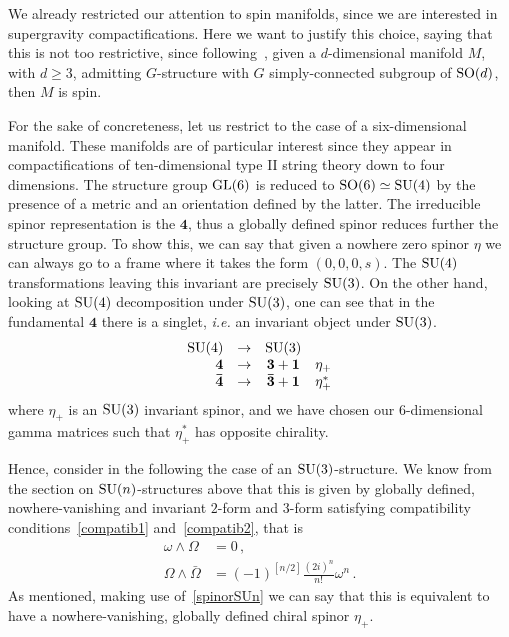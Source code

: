 \documentclass[debug]{phd}
\begin{document}
				We already restricted our attention to spin manifolds, since we are interested in supergravity compactifications.
				Here we want to justify this choice, saying that this is not too restrictive, since following~\cite[prop. 3.6.2]{joyce}, given a $d$-dimensional manifold $M$, with $d \geq 3$, admitting  $G$-structure with $G$ simply-connected subgroup of $\mathrm{SO}(d)$, then $M$ is spin.
				
				For the sake of concreteness, let us restrict to the case of a six-dimensional manifold. 
				These manifolds are of particular interest since they appear in compactifications of ten-dimensional type II string theory down to four dimensions.
				The structure group $\mathrm{GL}(6)$ is reduced to $\mathrm{SO}(6) \simeq \mathrm{SU}(4)$ by the presence of a metric and an orientation defined by the latter.
				The irreducible spinor representation is the $\mathbf{4}$, thus a globally defined spinor reduces further the structure group.
				To show this, we can say that given a  nowhere zero spinor $\eta$ we can always go to a frame where it takes the form $\left(0,0,0,s\right)$. 
				The $\mathrm{SU}(4)$ transformations leaving this invariant are precisely $\mathrm{SU}(3)$.
				On the other hand, looking at $\mathrm{SU}(4)$ decomposition under $\mathrm{SU}(3)$, one can see that in the fundamental $\mathbf{4}$ there is a singlet, \emph{i.e.} an invariant object under $\mathrm{SU}(3)$.
						\begin{equation*}
							\begin{array}{rccr}
								\mathrm{SU}(4) 			&	\rightarrow	&	\mathrm{SU}(3)					&					\\
								\mathbf{4}			&	\rightarrow	&	\mathbf{3} + \mathbf{1}		&	\eta_+			\\
								\mathbf{\bar{4}}		&	\rightarrow	&	\mathbf{\bar{3}} + \mathbf{1}	&	\eta_+^*					
							\end{array}
						\end{equation*}
				where $\eta_+$ is an $\mathrm{SU}(3)$ invariant spinor, and we have chosen our $6$-dimensional gamma matrices such that $\eta_+^*$ has opposite chirality.
				
				Hence, consider in the following the case of an $\mathrm{SU}(3)$-structure.
				We know from the section on $\mathrm{SU}(n)$-structures above that this is given by globally defined, nowhere-vanishing and invariant $2$-form and $3$-form satisfying compatibility conditions~\eqref{compatib1} and~\eqref{compatib2}, that is
						\begin{align*}
							\omega \wedge \Omega &= 0\, , \\
							\Omega \wedge \bar{\Omega} &= (-1)^{[n/2]} \frac{(2i)^n}{n!} \omega^n\, .
						\end{align*}
				As mentioned, making use of~\eqref{spinorSUn} we can say that this is equivalent to have a nowhere-vanishing, globally defined chiral spinor $\eta_+$.
				
\end{document}
